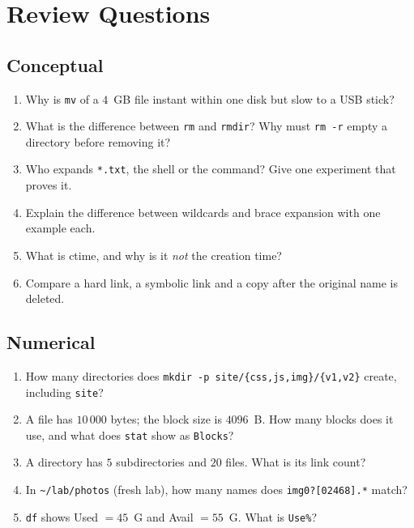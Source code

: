 \documentclass[11pt,a4paper]{article}
\newcommand{\cmd}[1]{\texttt{#1}}
\begin{document}
\section{Review Questions}

\subsection*{Conceptual}
\begin{enumerate}[leftmargin=1.6em]
  \item Why is \cmd{mv} of a $4$~GB file instant within one disk but slow to a USB stick?
  \item What is the difference between \cmd{rm} and \cmd{rmdir}? Why must \cmd{rm -r} empty a directory before removing it?
  \item Who expands \texttt{*.txt}, the shell or the command? Give one experiment that proves it.
  \item Explain the difference between wildcards and brace expansion with one example each.
  \item What is ctime, and why is it \emph{not} the creation time?
  \item Compare a hard link, a symbolic link and a copy after the original name is deleted.
\end{enumerate}

\subsection*{Numerical}
\begin{enumerate}[leftmargin=1.6em,resume]
  \item How many directories does \cmd{mkdir -p site/\{css,js,img\}/\{v1,v2\}} create, including \texttt{site}?
  \item A file has $10\,000$ bytes; the block size is $4096$~B. How many blocks does it use, and what does \cmd{stat} show as \texttt{Blocks}?
  \item A directory has $5$ subdirectories and $20$ files. What is its link count?
  \item In \texttt{\textasciitilde/lab/photos} (fresh lab), how many names does \texttt{img0?[02468].*} match?
  \item \cmd{df} shows Used $= 45$~G and Avail $= 55$~G. What is \texttt{Use\%}?
\end{enumerate}
\end{document}
